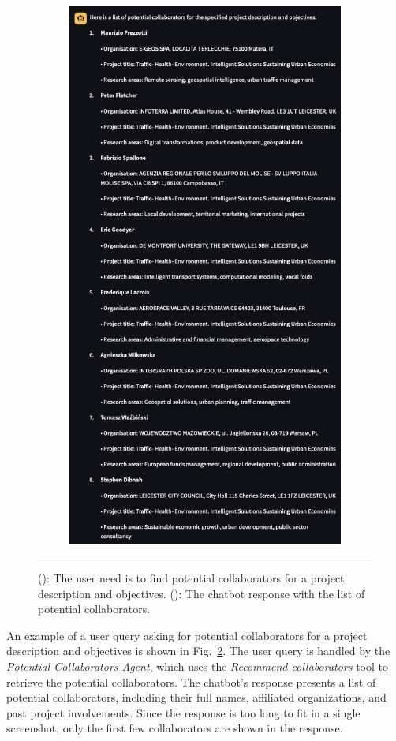 \begin{figure}[h]
\begin{subfigure}{0.45\textwidth}
        \includegraphics[width=.6\textwidth]{figures/implementation/example-collaborators-recommendation-answer.png}
        \caption{}
        \label{fig:example-collaborators-answer}
    \end{subfigure}
    \rule{35em}{0.5pt}
    \caption{(): The user need is to find potential collaborators for a project description and objectives.
    (): The chatbot response with the list of potential collaborators.}
    \label{fig:example-collaborators-recommendation}
\end{figure}

An example of a user query asking for potential collaborators for a project description and objectives is shown in Fig.~\ref{fig:example-collaborators-recommendation}.
The user query is handled by the \textit{Potential Collaborators Agent}, which uses the \textit{Recommend collaborators} tool to retrieve the potential collaborators.
The chatbot's response presents a list of potential collaborators, including their full names, affiliated organizations, and past project involvements.
Since the response is too long to fit in a single screenshot, only the first few collaborators are shown in the response.

